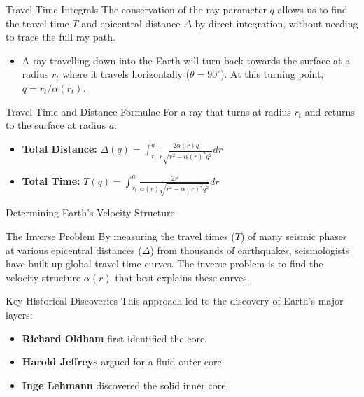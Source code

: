 \documentclass{beamer}
\begin{document}
\begin{frame}{Travel-Time Integrals}
    The conservation of the ray parameter $q$ allows us to find the travel time $T$ and epicentral distance $\Delta$ by direct integration, without needing to trace the full ray path.
    \pause
    \begin{itemize}
        \item A ray travelling down into the Earth will turn back towards the surface at a radius $r_t$ where it travels horizontally ($\theta=90^\circ$). At this turning point, $q = r_t / \alpha(r_t)$.
    \end{itemize}
    \pause
    \begin{alertblock}{Travel-Time and Distance Formulae}
        For a ray that turns at radius $r_t$ and returns to the surface at radius $a$:
        \begin{itemize}
            \item \textbf{Total Distance:} $ \Delta(q) = \int_{r_{t}}^{a}\frac{2\alpha(r)q}{r\sqrt{r^{2}-\alpha(r)^{2}q^{2}}}dr $
            \item \textbf{Total Time:} $ T(q) = \int_{r_{t}}^{a}\frac{2r}{\alpha(r)\sqrt{r^{2}-\alpha(r)^{2}q^{2}}}dr $
        \end{itemize}
    \end{alertblock}
\end{frame}


\begin{frame}{Determining Earth's Velocity Structure}
    \begin{block}{The Inverse Problem}
        By measuring the travel times ($T$) of many seismic phases at various epicentral distances ($\Delta$) from thousands of earthquakes, seismologists have built up global travel-time curves. The inverse problem is to find the velocity structure $\alpha(r)$ that best explains these curves.
    \end{block}
    \pause
    \begin{exampleblock}{Key Historical Discoveries}
        This approach led to the discovery of Earth's major layers:
        \begin{itemize}
            \item \textbf{Richard Oldham} first identified the core.
            \item \textbf{Harold Jeffreys} argued for a fluid outer core.
            \item \textbf{Inge Lehmann} discovered the solid inner core.
        \end{itemize}
    \end{exampleblock}
\end{frame}
\end{document}
